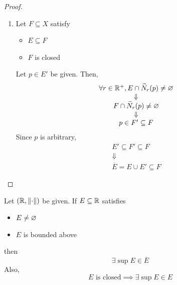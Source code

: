 \begin{proof}
\begin{enumerate}[label=\textbf{(\Alph*)}]
        \item Let $F \subseteq X$ satisfy
        \begin{itemize}
            \item $E \subseteq F$
            \item $F$ is closed
        \end{itemize}
        Let $p \in E'$ be given. Then,
        \[
        \begin{array}{c}
            \forall r \in \R^{+}, E \cap \widetilde{N}_{r}(p) \neq \vnot \\
            \Downarrow \\
            F \cap \widetilde{N}_{r}(p) \neq \vnot \\
            \Downarrow \\
            p \in F' \subseteq F
        \end{array}
        \]
        Since $p$ is arbitrary,
        \[
        \begin{array}{c}
            E' \subseteq F' \subseteq F \\
            \Downarrow \\
            \overline{E} = E \cup E' \subseteq F
        \end{array}
        \]
    \end{enumerate}
\end{proof}

\bigskip

\begin{theorem} \label{an:thm:supremum-in-closure}
    Let $\paren*{\R, \norm*{\cdot}}$ be given. If $E \subseteq \R$ satisfies
    \begin{itemize}
        \item $E \neq \vnot$
        \item $E$ is bounded above
    \end{itemize}
    then
    \[
    \exists \sup E \in \overline{E}
    \]
    Also,
    \[
    E \text{ is closed} \implies \exists \sup E \in E
    \]
\end{theorem}

